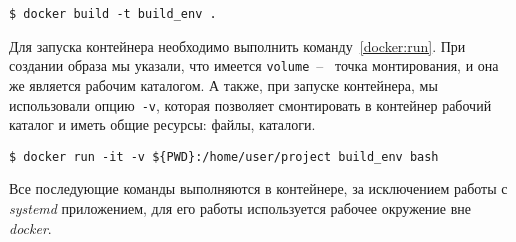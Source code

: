 \begin{lstlisting}[caption={Сборка образа}, label={docker:build}]
$ docker build -t build_env .
\end{lstlisting}

Для запуска контейнера необходимо выполнить команду~\ref{docker:run}. При создании
образа мы указали, что имеется \texttt{volume}~--~ точка монтирования, и она же
является рабочим каталогом. А также, при запуске контейнера, мы использовали
опцию~\mbox{\texttt{-v}}, которая позволяет смонтировать в контейнер рабочий каталог и
иметь общие ресурсы: файлы, каталоги.

\begin{lstlisting}[caption={Запуск контейнера}, label={docker:run}]
$ docker run -it -v ${PWD}:/home/user/project build_env bash
\end{lstlisting}

Все последующие команды выполняются в контейнере, за исключением работы с
\textit{systemd} приложением, для его работы используется рабочее окружение
вне \textit{docker}.
